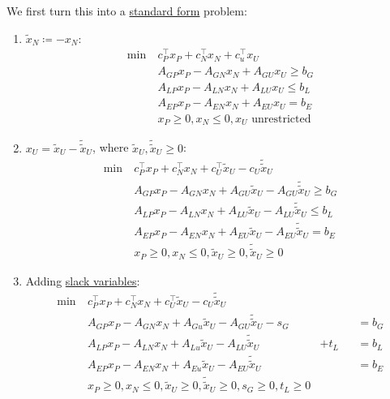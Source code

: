 We first turn this into a \hyperref[def:standard-form]{standard form} problem:
\begin{enumerate}
	\item \(\widetilde{x}_N \coloneqq -x_N\):
	      \begin{align*}
		      \min~ & c^{\top}_P x_P + c^{\top}_N x_N + c^{\top}_u x_U \\
		            & A_{GP}x_P -A_{GN}x_N + A_{GU}x_U\geq b_G         \\
		            & A_{LP}x_P -A_{LN}x_N + A_{LU}x_U \leq b_L        \\
		            & A_{EP}x_P -A_{EN}x_N + A_{EU}x_U = b_E           \\
		            & x_P\geq 0, x_N \leq 0, x_U \text{ unrestricted}
	      \end{align*}
	\item \(x_U = \widetilde{x}_U - \widetilde{\widetilde{x}}_U\), where \(\widetilde{x}_U, \widetilde{\widetilde{x}}_U \geq 0\):
	      \begin{align*}
		      \min~ & c^{\top}_P x_P + c^{\top}_N x_N + c^{\top}_U \widetilde{x}_U - c_U \widetilde{\widetilde{x}}_U \\
		            & A_{GP}x_P -A_{GN}x_N + A_{GU}\widetilde{x}_U -A_{GU}\widetilde{\widetilde{x}}_U \geq b_G       \\
		            & A_{LP}x_P -A_{LN}x_N + A_{LU}\widetilde{x}_U -A_{LU}\widetilde{\widetilde{x}}_U\leq b_L        \\
		            & A_{EP}x_P -A_{EN}x_N + A_{EU}\widetilde{x}_U -A_{EU}\widetilde{\widetilde{x}}_U= b_E           \\
		            & x_P\geq 0, x_N \leq 0, \widetilde{x}_U \geq 0, \widetilde{\widetilde{x}}_U\geq 0
	      \end{align*}
	\item Adding \hyperref[def:slack-variable]{slack variables}:
	      \[
		      \begin{alignedat}{3}
			      \min~ & c^{\top}_P x_P + c^{\top}_N x_N + c^{\top}_U \widetilde{x}_U - c_U \widetilde{\widetilde{x}}_U    \\
			      & A_{GP}x_P -A_{GN}x_N + A_{Gu}\widetilde{x}_U -A_{GU}\widetilde{\widetilde{x}}_U - s_G &       && = b_G \\
			      & A_{LP}x_P -A_{LN}x_N + A_{Lu}\widetilde{x}_U -A_{LU}\widetilde{\widetilde{x}}_U       & + t_L && = b_L \\
			      & A_{EP}x_P -A_{EN}x_N + A_{Eu}\widetilde{x}_U -A_{EU}\widetilde{\widetilde{x}}_U       &       && = b_E \\
			      & x_P\geq 0, x_N \leq 0, \widetilde{x}_U \geq 0, \widetilde{\widetilde{x}}_U\geq 0, s_G\geq 0, t_L \geq 0
		      \end{alignedat}
	      \]
\end{enumerate}

